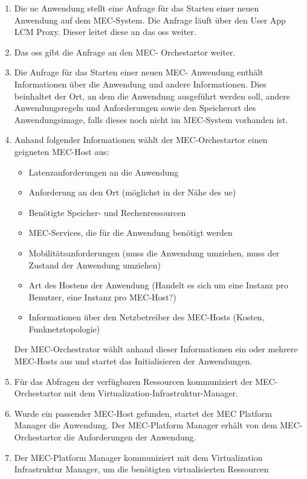 \documentclass[runningheads]{llncs}
\numberwithin{figure}{section}
\begin{document}
\begin{enumerate}
  \item Die \acrshort{ue} Anwendung stellt eine Anfrage für das Starten einer neuen Anwendung auf dem MEC-System. Die Anfrage läuft über den 
  User App LCM Proxy. Dieser leitet diese an das \acrlong{oss} weiter.
  \item Das \acrshort{oss} gibt die Anfrage an den MEC- Orchestartor weiter.
  \item Die Anfrage für das Starten einer neuen MEC- Anwendung enthält Informationen über 
  die Anwendung und andere Informationen. Dies beinhaltet der Ort, an dem die Anwendung ausgeführt werden soll, 
  andere Anwendungsregeln und Anforderungen sowie den Speicherort des Anwendungsimage, 
  falls dieses noch nicht im MEC-System vorhanden ist. 
  \item Anhand folgender Informationen wählt der MEC-Orchestartor einen geigneten MEC-Host aus:
  \begin{itemize}
    \item Latenzanforderungen an die Anwendung
    \item Anforderung an den Ort (möglichst in der Nähe des \acrshort{ue})
    \item Benötigte Speicher- und Rechenressourcen
    \item MEC-Services, die für die Anwendung benötigt werden
    \item Mobilitätsanforderungen (muss die Anwendung umziehen, muss der Zustand der Anwendung umziehen)
    \item Art des Hostens der Anwendung (Handelt es sich um eine Instanz pro Benutzer, eine Instanz pro MEC-Host?)
    \item Informationen über den Netzbetreiber des MEC-Hosts (Kosten, Funknetztopologie)
  \end{itemize}
  Der MEC-Orchestrator wählt anhand dieser Informationen ein oder mehrere MEC-Hosts aus und startet das Initialisieren der Anwendungen.
  \item Für das Abfragen der verfügbaren Ressourcen kommuniziert der MEC-Orchestartor mit dem Virtualization-Infrastruktur-Manager.
  \item Wurde ein passender MEC-Host gefunden, startet der MEC Platform Manager die Anwendung. Der MEC-Platform Manager erhält von dem 
  MEC-Orchestartor die Anforderungen der Anwendung.
  \item Der MEC-Platform Manager kommuniziert mit dem Virtualization Infrastruktur Manager, um die benötigten virtualisierten Ressourcen 

\end{enumerate}
\end{document}
